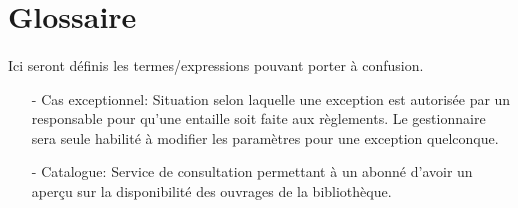 \section*{Glossaire}
\paragraph{} Ici seront définis les termes/expressions pouvant porter à confusion.\par
 \begin{enumerate}
     \item[-] Cas exceptionnel: Situation selon laquelle une exception est autorisée 
     par un responsable pour qu’une entaille soit faite aux règlements. 
     Le gestionnaire sera seule habilité à modifier les paramètres pour une 
     exception quelconque.
     \item[-] Catalogue: Service de consultation permettant à un abonné d’avoir 
     un aperçu sur la disponibilité des ouvrages de la bibliothèque.
    
 \end{enumerate}
  
